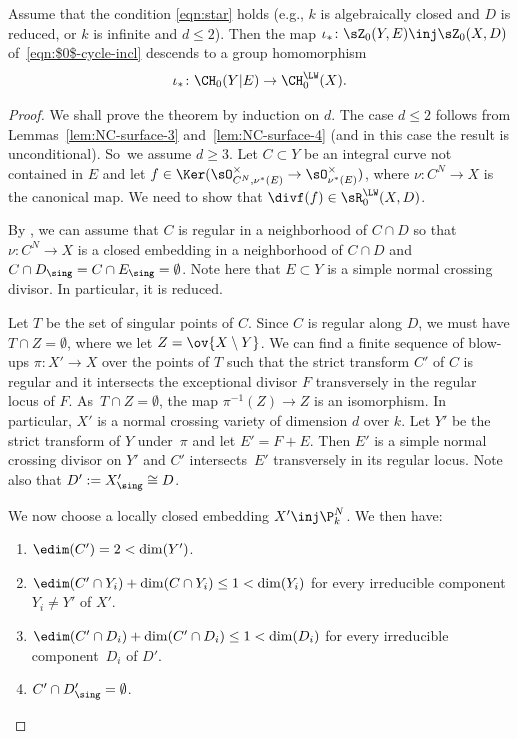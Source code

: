 \begin{thm}\label{thm:Reg-mod-LW}
Assume that the condition \eqref{eqn:star} holds
(e.g., $k$ is algebraically closed and
$D$ is reduced, or $k$ is infinite and $d \leq 2$).
Then the map $\iota_* \colon \sZ_0(Y, E) \inj \sZ_0(X, D)$ of~\eqref{eqn:$0$-cycle-incl} descends to a group
homomorphism
\[
\iota_* \colon \CH_0(Y|E) \to \CH^{\LW}_0(X).
\]
\end{thm}
\begin{proof}
We shall prove the theorem by induction on $d$.
The case $d \le 2$ follows from Lemmas~\ref{lem:NC-surface-3} and~\ref{lem:NC-surface-4} (and in this case the result is unconditional).
So~we assume $d \ge 3$.
Let $C \subset Y$ be an integral curve not contained in $E$
and let \hbox{$f \in \Ker(\sO^{\times}_{C^N,\nu^*(E)} \to \sO^{\times}_{\nu^*(E)})$},
where $\nu: C^N \to X$ is the canonical map.
We need to show that $\divf(f) \in \sR^{\LW}_0(X,D)$.

By , we can assume that $C$ is regular in a
neighborhood of $C \cap D$ so that $\nu:C^N \to X$ is a closed embedding
in a neighborhood of $C \cap D$ and $C \cap D_{\sing} = C \cap E_{\sing} =
\emptyset$. Note here that $E \subset Y$ is a simple normal crossing divisor.
In particular, it is reduced.

Let $T$ be the set of singular points of $C$. Since $C$ is
regular along $D$, we must have $T \cap Z = \emptyset$,
where we let $Z = \ov{X \setminus Y}$.
We can find a finite sequence of blow-ups $\pi: X' \to X$ over the
points of $T$ such that the strict transform $C'$ of $C$ is regular and
it intersects the exceptional divisor $F$ transversely in the regular locus of
$F$. As~$T \cap Z = \emptyset$, the map $\pi^{-1}(Z) \to Z$ is an isomorphism.
In particular, $X'$ is a normal crossing variety of dimension $d$ over $k$.
Let $Y'$ be the strict transform of $Y$ under~$\pi$
and let $E' = F + E$.
Then $E'$ is a simple normal crossing divisor on $Y'$ and $C'$ intersects~$E'$ transversely in its regular locus.
Note also that $D':= X'_\sing \cong D$.

We now choose a locally closed embedding $X' \inj \P^N_k$.
We then have:
\begin{enumerate}
\item\label{enum:b1}
$\edim(C') = 2 < \dim(Y')$.
\item\label{enum:b2}
$\edim(C' \cap Y_i) + \dim(C \cap Y_i) \le 1 < \dim(Y_i)$ for every irreducible
component $Y_i \neq Y'$ of $X'$.
\item\label{enum:b3}
$\edim(C' \cap D_i) + \dim(C' \cap D_i) \le 1 < \dim(D_i)$ for every irreducible
component~$D_i$ of $D'$.
\item\label{enum:b4}
$C' \cap D'_{\sing} = \emptyset$.
\end{enumerate}


\end{proof}
